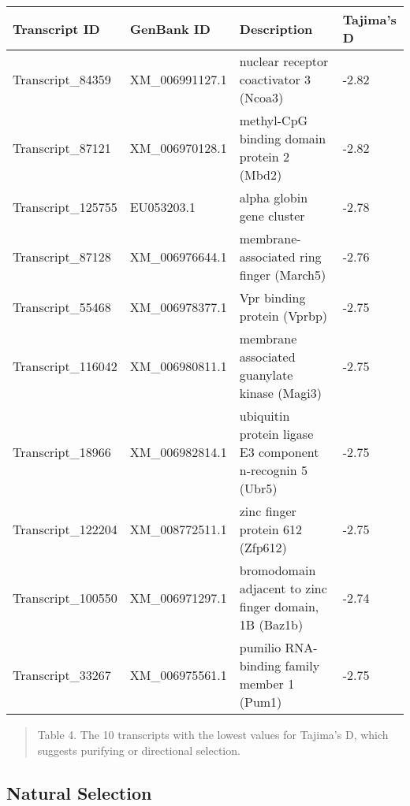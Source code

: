 \documentclass[12pt]{article}
\begin{document}
\begin{center}
\begin{adjustwidth}{-.75in}{-.75in}%
\begin{tabular}{ l l l l }
\textbf{Transcript ID} & \textbf{GenBank ID} & \textbf{Description} & \textbf{Tajima's D} \\
\hline
Transcript\_84359 & XM\_006991127.1 & nuclear receptor coactivator 3 (Ncoa3) & -2.82\\
Transcript\_87121 & XM\_006970128.1 & methyl-CpG binding domain protein 2 (Mbd2) & -2.82 \\
Transcript\_125755 & EU053203.1 & alpha globin gene cluster & -2.78\\
Transcript\_87128 & XM\_006976644.1 & membrane-associated ring finger (March5) & -2.76 \\
Transcript\_55468 & XM\_006978377.1 & Vpr binding protein (Vprbp) & -2.75\\
Transcript\_116042 & XM\_006980811.1 & membrane associated guanylate kinase (Magi3) & -2.75  \\
Transcript\_18966 & XM\_006982814.1 & ubiquitin protein ligase E3 component n-recognin 5 (Ubr5) & -2.75 \\
Transcript\_122204 & XM\_008772511.1 & zinc finger protein 612 (Zfp612) & -2.75 \\
Transcript\_100550 & XM\_006971297.1 & bromodomain adjacent to zinc finger domain, 1B (Baz1b) & -2.74\\
Transcript\_33267 & XM\_006975561.1 & pumilio RNA-binding family member 1 (Pum1) & -2.75\\
 \end{tabular}
\begin{quote}
\small{Table 4. The 10 transcripts with the lowest values for Tajima's D, which suggests purifying or directional selection.}
\end{quote}  
\end{adjustwidth}
\end{center}

\subsection*{Natural Selection}
\end{document}
